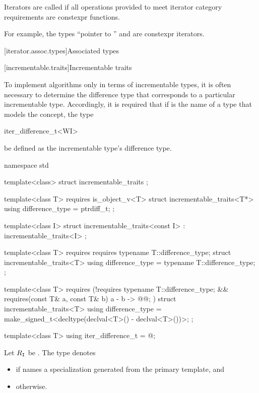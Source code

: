 \pnum
{}%
Iterators are called 
if all operations provided to meet iterator category requirements
are constexpr functions.
\begin{note}
For example, the types ``pointer to '' and
 are constexpr iterators.
\end{note}

[iterator.assoc.types]{Associated types}

[incrementable.traits]{Incrementable traits}

\pnum
To implement algorithms only in terms of incrementable types,
it is often necessary to determine the difference type that
corresponds to a particular incrementable type. Accordingly,
it is required that if  is the name of a type that models the
 concept,
the type
\begin{codeblock}
iter_difference_t<WI>
\end{codeblock}
be defined as the incrementable type's difference type.

%
\begin{codeblock}
namespace std {
  template<class> struct incrementable_traits { };

  template<class T>
    requires is_object_v<T>
  struct incrementable_traits<T*> {
    using difference_type = ptrdiff_t;
  };

  template<class I>
  struct incrementable_traits<const I>
    : incrementable_traits<I> { };

  template<class T>
    requires requires { typename T::difference_type; }
  struct incrementable_traits<T> {
    using difference_type = typename T::difference_type;
  };

  template<class T>
    requires (!requires { typename T::difference_type; } &&
              requires(const T& a, const T& b) { { a - b } -> @@; })
  struct incrementable_traits<T> {
    using difference_type = make_signed_t<decltype(declval<T>() - declval<T>())>;
  };

  template<class T>
    using iter_difference_t = @\seebelow@;
}
\end{codeblock}

%
\pnum
Let $R_{\texttt{I}}$ be .
The type  denotes
\begin{itemize}
\item
{}
if  names a specialization
generated from the primary template, and

\item
{} otherwise.
\end{itemize}

